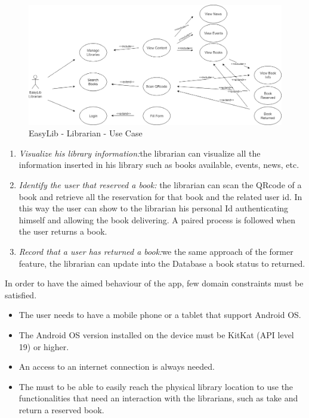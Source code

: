 \newpage
{}
\begin{figure}[H]
	\centering
	\includegraphics[scale=0.4]{Images/UseCases/EasyLib_Librarian_use_case}
	\caption{EasyLib - Librarian - Use Case}
\end{figure}
\begin{enumerate}
\item \emph{Visualize his library information:}the librarian can visualize all the information inserted in his library such as books available, events, news, etc.
\item \emph{Identify the user that reserved a book:} the librarian can scan the QRcode of a book and retrieve all the reservation for that book and the related user id. In this way the user can show to the librarian his personal Id authenticating himself and allowing the book delivering. A paired process is followed when the user returns a book.
\item \emph{Record that a user has returned a book:}we the same approach of the former feature, the librarian can update into the Database a book status to returned.
\end{enumerate}


In order to have the aimed behaviour of the app, few domain constraints must be satisfied.

\begin{itemize}
	\item The user needs to have a mobile phone or a tablet that support Android OS.
	\item The Android OS version installed on the device must be KitKat (API level 19) or higher.
	\item An access to an internet connection is always needed.
	\item The must to be able to easily reach the physical library location to use the functionalities that need an interaction with the librarians, such as take and return a reserved book.
\end{itemize}